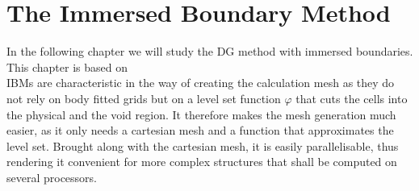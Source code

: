 \chapter{The Immersed Boundary Method}
\label{immersedBoundaries}
In the following chapter we will study the DG method with immersed boundaries. This chapter is based on \textcite{paper} \\ \indent 
IBMs are characteristic in the way of creating the calculation mesh as they do not rely on body fitted grids but on a level set function $\varphi$ that cuts the cells into the physical and the void region. It therefore makes the mesh generation much easier, as it only needs a cartesian mesh and a function that approximates the level set. Brought along with the cartesian mesh, it is easily parallelisable, thus rendering it convenient for more complex structures that shall be computed on several processors.
